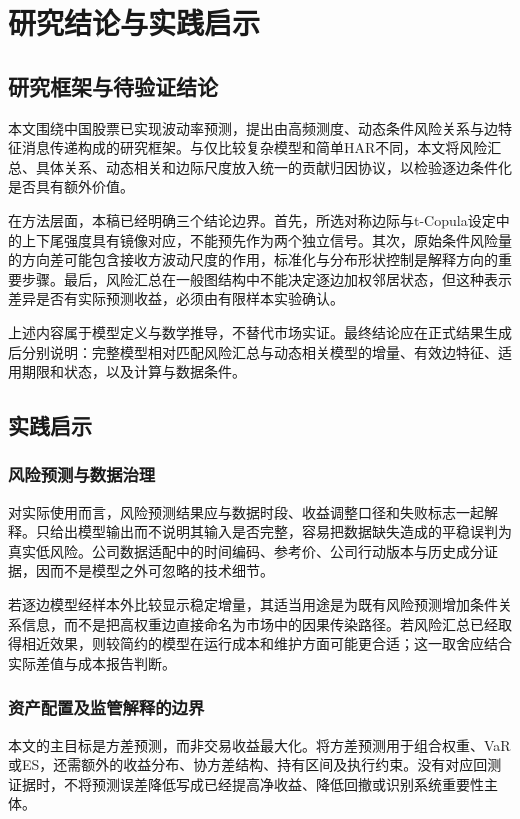 \chapter{研究结论与实践启示}
\section{研究框架与待验证结论}
本文围绕中国股票已实现波动率预测，提出由高频测度、动态条件风险关系与边特征消息传递构成的研究框架。与仅比较复杂模型和简单HAR不同，本文将风险汇总、具体关系、动态相关和边际尺度放入统一的贡献归因协议，以检验逐边条件化是否具有额外价值。

在方法层面，本稿已经明确三个结论边界。首先，所选对称边际与t-Copula设定中的上下尾强度具有镜像对应，不能预先作为两个独立信号。其次，原始条件风险量的方向差可能包含接收方波动尺度的作用，标准化与分布形状控制是解释方向的重要步骤。最后，风险汇总在一般图结构中不能决定逐边加权邻居状态，但这种表示差异是否有实际预测收益，必须由有限样本实验确认。

上述内容属于模型定义与数学推导，不替代市场实证。最终结论应在正式结果生成后分别说明：完整模型相对匹配风险汇总与动态相关模型的增量、有效边特征、适用期限和状态，以及计算与数据条件。


\section{实践启示}
\subsection{风险预测与数据治理}
对实际使用而言，风险预测结果应与数据时段、收益调整口径和失败标志一起解释。只给出模型输出而不说明其输入是否完整，容易把数据缺失造成的平稳误判为真实低风险。公司数据适配中的时间编码、参考价、公司行动版本与历史成分证据，因而不是模型之外可忽略的技术细节。

若逐边模型经样本外比较显示稳定增量，其适当用途是为既有风险预测增加条件关系信息，而不是把高权重边直接命名为市场中的因果传染路径。若风险汇总已经取得相近效果，则较简约的模型在运行成本和维护方面可能更合适；这一取舍应结合实际差值与成本报告判断。

\subsection{资产配置及监管解释的边界}
本文的主目标是方差预测，而非交易收益最大化。将方差预测用于组合权重、VaR或ES，还需额外的收益分布、协方差结构、持有区间及执行约束。没有对应回测证据时，不将预测误差降低写成已经提高净收益、降低回撤或识别系统重要性主体。

